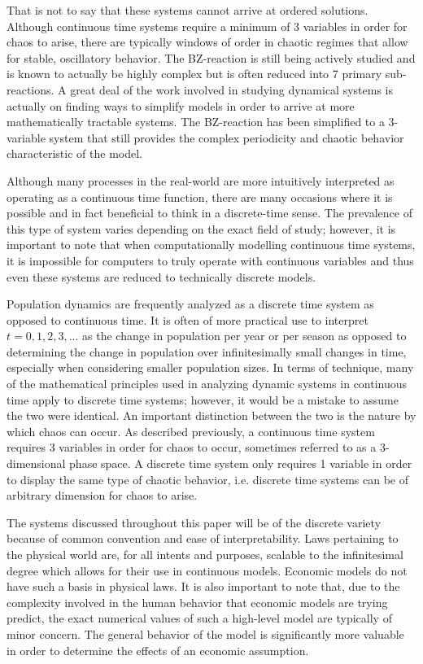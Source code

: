 That is not to say that these systems cannot arrive at ordered solutions.  Although continuous time systems require a minimum of 3 variables in order for chaos to arise, there are typically windows of order in chaotic regimes that allow for stable, oscillatory behavior. The BZ-reaction is still being actively studied and is known to actually be highly complex but is often reduced into 7 primary sub-reactions\autocite{Field1986}. A great deal of the work involved in studying dynamical systems is actually on finding ways to simplify models in order to arrive at more mathematically tractable systems. The BZ-reaction has been simplified to a 3-variable system that still provides the complex periodicity and chaotic behavior characteristic of the model\autocite{Gyorgyi1992}.

Although many processes in the real-world are more intuitively interpreted as operating as a continuous time  function, there are many  occasions where it is possible and  in fact beneficial to think in a discrete-time sense. The prevalence of this type of system varies depending on the exact field of study; however, it is important to note that when computationally modelling continuous time systems, it is impossible for computers to truly operate with continuous variables and thus even these systems are reduced to technically discrete models.

Population dynamics are frequently analyzed as a discrete time system as opposed to continuous time. It is often of more practical use to interpret $t= 0,1,2,3,...$ as the change in population per year or per season as opposed to determining the change in population over infinitesimally small changes in time, especially when considering smaller population sizes. In terms of technique, many of the mathematical principles used in analyzing dynamic systems in continuous time apply to discrete time systems; however, it would be a mistake to assume the two were identical. An important distinction between the two is the nature by which chaos can occur. As described previously, a continuous time system requires 3 variables in order for chaos to occur, sometimes referred to as a 3-dimensional phase space. A discrete time system only requires 1 variable in order to display the same type of chaotic behavior, i.e. discrete time systems can be of arbitrary dimension for chaos to arise.

The systems discussed throughout this paper will be of the discrete variety because of common convention and ease of interpretability. Laws pertaining to the physical world are, for all intents and purposes, scalable to the infinitesimal degree which allows for their use in continuous models. Economic models do not have such a basis in physical laws. It is also important to note that, due to the complexity involved in the human behavior that economic models are trying predict, the exact numerical values of such a high-level model are typically of minor concern. The general behavior of the model is significantly more valuable in order to determine the effects of an economic assumption.

